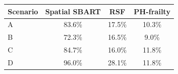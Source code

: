 \begin{tabular}{lccc}
\toprule
Scenario & Spatial SBART & RSF & PH-frailty \\
\midrule
A & 83.6\% & 17.5\% & 10.3\% \\
B & 72.3\% & 16.5\% & 9.0\% \\
C & 84.7\% & 16.0\% & 11.8\% \\
D & 96.0\% & 28.1\% & 11.8\% \\
\bottomrule
\end{tabular}
